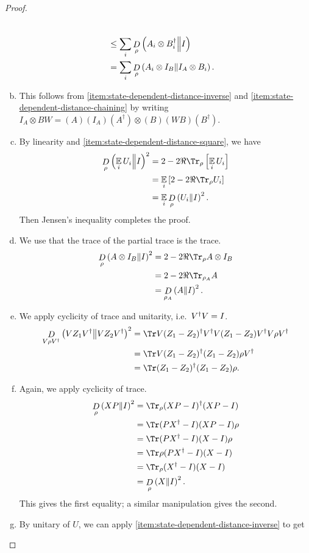 \begin{proof}
\begin{enumerate}[(a)]
\begin{align}
		\\&\leq \sum_i \mathop{D}\limits_{\rho}\left(A_i\otimes B_i^\dagger\middle\| I\right)
		\\&= \sum_i \mathop{D}\limits_{\rho}\left(A_i\otimes I_B\middle\| I_A \otimes B_i\right).
	\end{align}
	\item This follows from \eqref{item:state-dependent-distance-inverse} and \eqref{item:state-dependent-distance-chaining} by writing $I_A \otimes BW = (A)(I_A)(A^\dagger)\otimes (B)(WB)(B^\dagger)$.
	\item By linearity and \eqref{item:state-dependent-distance-square}, we have
	\begin{align}
		\drho{\rho}{\E{i}{U_i}}{I}^2 
		&= 2 - 2\Re\Tr_\rho\left[\E{i} U_i\right]
		\\&= \E{i}\left[ 2 - 2\Re\Tr_\rho U_i\right]
		\\&= \E{i} \drho{\rho}{U_i}{I}^2.
	\end{align}
	Then Jensen's inequality completes the proof. 
	\item We use that the trace of the partial trace is the trace.
	\begin{align}
		\drho{\rho}{A\otimes I_B}{I}^2 
		&= 2 - 2\Re\Tr_\rho A\otimes I_B 
		\\&= 2 - 2\Re\Tr_{\rho_A}A 
		\\&= \drho{\rho_A}{A}{I}^2.
	\end{align}
	\item We apply cyclicity of trace and unitarity, i.e.\ $V^\dagger V = I$. 
	\begin{align}
		\drho{V\rho V\dagg}{VZ_1V\dagg}{VZ_2V\dagg}^2
		&= \Tr V(Z_1-Z_2)\dagg V\dagg V(Z_1-Z_2)V\dagg V\rho V\dagg
		\\&= \Tr V(Z_1-Z_2)\dagg (Z_1-Z_2)\rho V\dagg
		\\&= \Tr (Z_1-Z_2)\dagg (Z_1-Z_2)\rho.
	\end{align}
	\item Again, we apply cyclicity of trace.
	\begin{align}
		\drho\rho{XP}I^2
		&= \Tr_\rho (XP- I)\dagg(XP-I)
		\\&= \Tr (PX\dagg- I)(XP-I)\rho
		\\&= \Tr (PX\dagg- I)(X-I)\rho
		\\&= \Tr \rho(PX\dagg- I)(X-I)
		\\&= \Tr_\rho(X\dagg- I)(X-I)
		\\&= \drho\rho XI^2.
	\end{align}
	This gives the first equality; a similar manipulation gives the second.
	\item By unitary of $U$, we can apply \eqref{item:state-dependent-distance-inverse} to get

\end{enumerate}
\end{proof}
